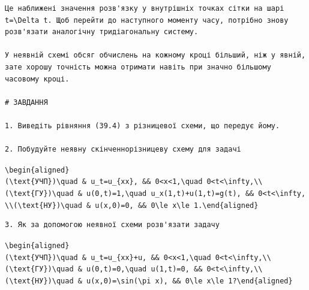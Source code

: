 \documentclass[
  ukrainian,
]{article}
\begin{document}
\begin{verbatim}
Це наближені значення розв'язку у внутрішніх точках сітки на шарі t=\Delta t. Щоб перейти до наступного моменту часу, потрібно знову розв'язати аналогічну тридіагональну систему.

У неявній схемі обсяг обчислень на кожному кроці більший, ніж у явній, зате хорошу точність можна отримати навіть при значно більшому часовому кроці.

# ЗАВДАННЯ

1. Виведіть рівняння (39.4) з різницевої схеми, що передує йому.

2. Побудуйте неявну скінченнорізницеву схему для задачі
\end{verbatim}

\texttt{\textbackslash{}begin\{aligned\}(\textbackslash{}text\{УЧП\})\textbackslash{}quad\ \&\ u\_t=u\_\{xx\},\ \&\&\ 0\textless{}x\textless{}1,\textbackslash{}quad\ 0\textless{}t\textless{}\textbackslash{}infty,\textbackslash{}\textbackslash{}(\textbackslash{}text\{ГУ\})\textbackslash{}quad\ \&\ u(0,t)=1,\textbackslash{}quad\ u\_x(1,t)+u(1,t)=g(t),\ \&\&\ 0\textless{}t\textless{}\textbackslash{}infty,\textbackslash{}\textbackslash{}(\textbackslash{}text\{НУ\})\textbackslash{}quad\ \&\ u(x,0)=0,\ \&\&\ 0\textbackslash{}le\ x\textbackslash{}le\ 1.\textbackslash{}end\{aligned\}}

\begin{verbatim}
3. Як за допомогою неявної схеми розв'язати задачу
\end{verbatim}

\texttt{\textbackslash{}begin\{aligned\}(\textbackslash{}text\{УЧП\})\textbackslash{}quad\ \&\ u\_t=u\_\{xx\}+u,\ \&\&\ 0\textless{}x\textless{}1,\textbackslash{}quad\ 0\textless{}t\textless{}\textbackslash{}infty,\textbackslash{}\textbackslash{}(\textbackslash{}text\{ГУ\})\textbackslash{}quad\ \&\ u(0,t)=0,\textbackslash{}quad\ u(1,t)=0,\ \&\&\ 0\textless{}t\textless{}\textbackslash{}infty,\textbackslash{}\textbackslash{}(\textbackslash{}text\{НУ\})\textbackslash{}quad\ \&\ u(x,0)=\textbackslash{}sin(\textbackslash{}pi\ x),\ \&\&\ 0\textbackslash{}le\ x\textbackslash{}le\ 1?\textbackslash{}end\{aligned\}}
\end{document}

